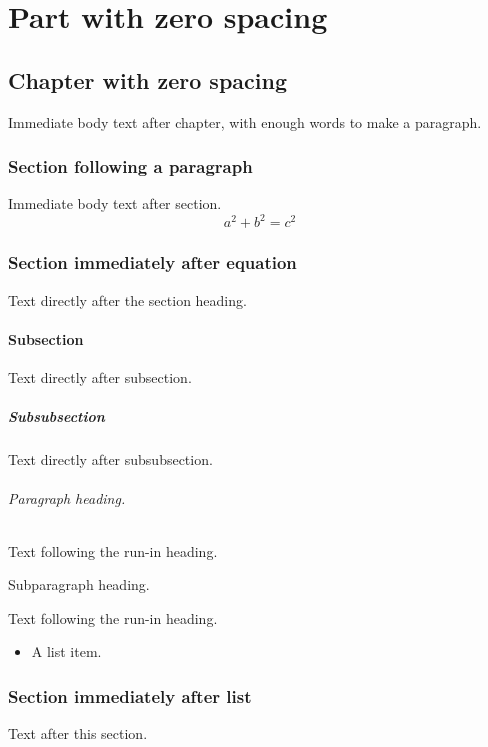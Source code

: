 \documentclass{report}
\begin{document}
\part{Part with zero spacing}
\chapter{Chapter with zero spacing}
Immediate body text after chapter, with enough words to make a paragraph.
\section{Section following a paragraph}
Immediate body text after section.
\begin{equation}
 a^2+b^2=c^2
\end{equation}
\section{Section immediately after equation}
Text directly after the section heading.
\subsection{Subsection}
Text directly after subsection.
\subsubsection{Subsubsection}
Text directly after subsubsection.
\paragraph{Paragraph heading.} Text following the run-in heading.
\subparagraph{Subparagraph heading.} Text following the run-in heading.
\begin{itemize}
\item A list item.
\end{itemize}
\section{Section immediately after list}
Text after this section.
\end{document}

